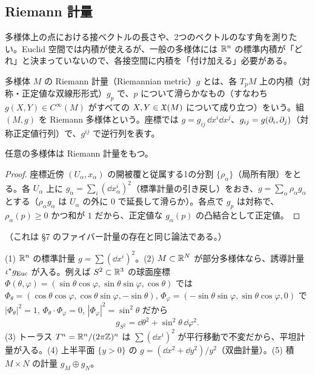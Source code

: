 \subsection{Riemann 計量}\label{B:ss:metric}

多様体上の点における接ベクトルの長さや、2つのベクトルのなす角を測りたい。Euclid 空間では内積が使えるが、一般の多様体には $\mathbb R^n$ の標準内積が「どれ」と決まっていないので、各接空間に内積を「付け加える」必要がある。

\begin{defn}[Riemann 計量]\label{B:def:metric}
多様体 $M$ の Riemann 計量（Riemannian metric）$g$ とは、各 $T_pM$ 上の内積（対称・正定値な双線形形式）$g_p$ で、$p$ について滑らかなもの（すなわち $g(X,Y)\in C^\infty(M)$ がすべての $X,Y\in\mathfrak X(M)$ について成り立つ）をいう。組 $(M,g)$ を \mbox{Riemann} 多様体という。座標では $g=g_{ij}\,\dd x^i\dd x^j$、$g_{ij}=g(\partial_i,\partial_j)$（対称正定値行列）で、$g^{ij}$ で逆行列を表す。
\end{defn}

\begin{prop}[存在]\label{B:prop:gexist}\tP
任意の多様体は Riemann 計量をもつ。
\end{prop}
\begin{proof}
座標近傍 $(U_\alpha,x_\alpha)$ の開被覆と従属する1の分割 $\{\rho_\alpha\}$（局所有限）をとる。各 $U_\alpha$ 上に $g_\alpha=\sum_i(\dd x^i_\alpha)^2$（標準計量の引き戻し）をおき、$g=\sum_\alpha\rho_\alpha g_\alpha$ とする（$\rho_\alpha g_\alpha$ は $U_\alpha$ の外に $0$ で延長して滑らか）。各点で $g_p$ は対称で、$\rho_\alpha(p)\ge0$ かつ和が $1$ だから、正定値な $g_\alpha(p)$ の凸結合として正定値。
\end{proof}
（これは §7 のファイバー計量の存在と同じ論法である。）

\begin{ex}[例]\label{B:ex:metric}
(1) $\mathbb R^n$ の標準計量 $g=\sum(\dd x^i)^2$。(2) $M\subset\mathbb R^N$ が部分多様体なら、誘導計量 $\iota^*g_{\rm Euc}$ が入る。例えば $S^2\subset\mathbb R^3$ の球面座標 $\Phi(\theta,\varphi)=(\sin\theta\cos\varphi,\sin\theta\sin\varphi,\cos\theta)$ では $\Phi_\theta=(\cos\theta\cos\varphi,\cos\theta\sin\varphi,-\sin\theta)$, $\Phi_\varphi=(-\sin\theta\sin\varphi,\sin\theta\cos\varphi,0)$ で $|\Phi_\theta|^2=1$, $\Phi_\theta\cdot\Phi_\varphi=0$, $|\Phi_\varphi|^2=\sin^2\theta$ だから
\[
g_{S^2}=\dd\theta^2+\sin^2\theta\,\dd\varphi^2 .
\]
(3) トーラス $T^n=\mathbb R^n/(2\pi\mathbb Z)^n$ は $\sum(\dd x^i)^2$ が平行移動で不変だから、平坦計量が入る。(4) 上半平面 $\{y>0\}$ の $g=(\dd x^2+\dd y^2)/y^2$（双曲計量）。(5) 積 $M\times N$ の計量 $g_M\oplus g_N$。
\end{ex}

